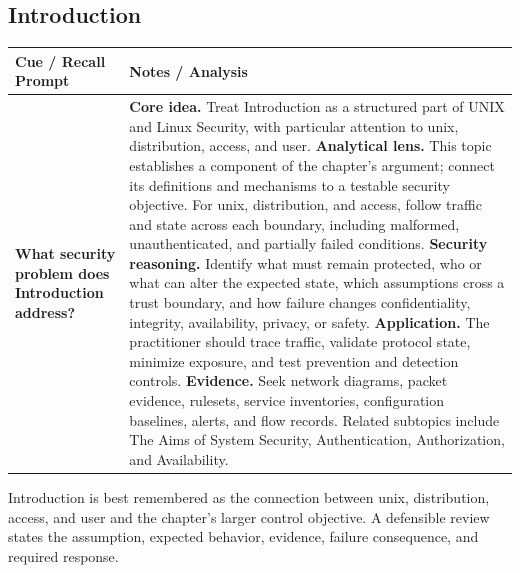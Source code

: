 \documentclass[11pt]{article}
\newcommand{\CornellHeader}{%
\rowcolor{Navy}\color{white}\bfseries Cue / Recall Prompt & \color{white}\bfseries Notes / Analysis\\\hline}
\newcommand{\CornellRow}[2]{%
\cellcolor{CueGray}\RaggedRight\textbf{#1} & \RaggedRight #2\\\hline}
\begin{document}
\subsection*{Introduction}
\begin{longtable}{>{\RaggedRight\arraybackslash}p{}|>{\RaggedRight\arraybackslash}p{}}
\CornellHeader
\CornellRow{What security problem does Introduction address?}{\textbf{Core idea.} Treat Introduction as a structured part of UNIX and Linux Security, with particular attention to unix, distribution, access, and user. \textbf{Analytical lens.} This topic establishes a component of the chapter's argument; connect its definitions and mechanisms to a testable security objective. For unix, distribution, and access, follow traffic and state across each boundary, including malformed, unauthenticated, and partially failed conditions. \textbf{Security reasoning.} Identify what must remain protected, who or what can alter the expected state, which assumptions cross a trust boundary, and how failure changes confidentiality, integrity, availability, privacy, or safety. \textbf{Application.} The practitioner should trace traffic, validate protocol state, minimize exposure, and test prevention and detection controls. \textbf{Evidence.} Seek network diagrams, packet evidence, rulesets, service inventories, configuration baselines, alerts, and flow records. Related subtopics include The Aims of System Security, Authentication, Authorization, and Availability.}
\end{longtable}
\begin{topicsummary}
Introduction is best remembered as the connection between unix, distribution, access, and user and the chapter's larger control objective. A defensible review states the assumption, expected behavior, evidence, failure consequence, and required response.
\end{topicsummary}
\end{document}
